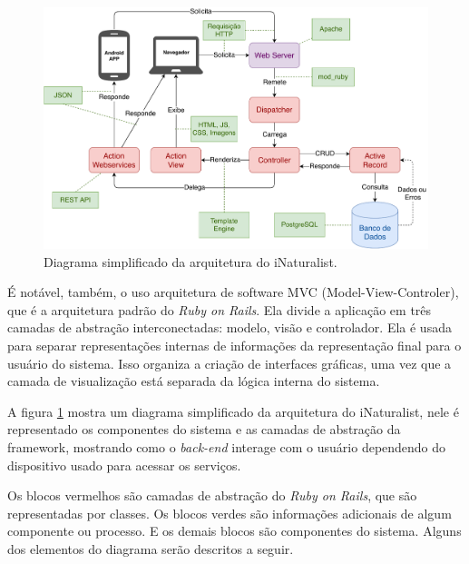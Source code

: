 \begin{figure}[h!]
  \centering
  \includegraphics[width=\textwidth]{figures/arch_diagram.pdf}
  \caption{Diagrama simplificado da arquitetura do iNaturalist.}
  \label{fig:arch}
\end{figure}

É notável, também, o uso arquitetura de software MVC (Model-View-Controler), que é a arquitetura padrão do \emph{Ruby on Rails}. Ela divide a aplicação em três camadas de abstração interconectadas: modelo, visão e controlador. Ela é usada para separar representações internas de informações da representação final para o usuário do sistema. Isso organiza a criação de interfaces gráficas, uma vez que a camada de visualização está separada da lógica interna do sistema.

A figura \ref{fig:arch} mostra um diagrama simplificado da arquitetura do iNaturalist, nele é representado os componentes do sistema e as camadas de abstração da framework, mostrando  como o \emph{back-end} interage com o usuário dependendo do dispositivo usado para acessar os serviços.

Os blocos vermelhos são camadas de abstração do \emph{Ruby on Rails}, que são representadas por classes. Os blocos verdes são informações adicionais de algum componente ou processo. E os demais blocos são componentes do sistema. Alguns dos elementos do diagrama serão descritos a seguir.

